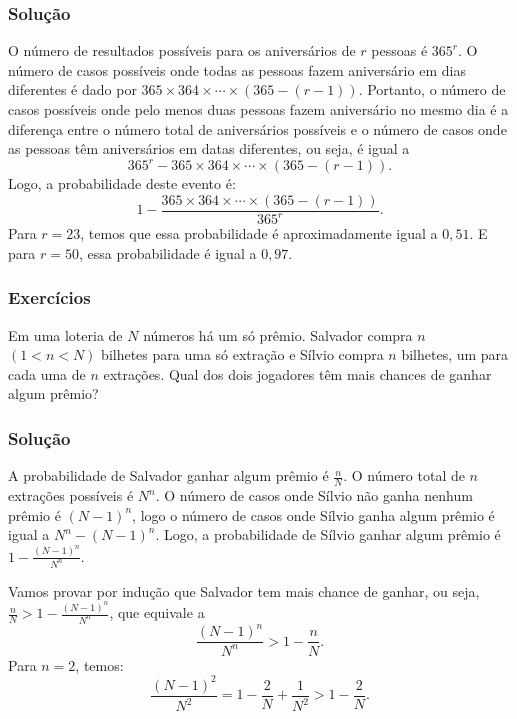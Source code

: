 \begin{frame}
\frametitle{\textbf{Solução}}
\baselineskip=13pt


O número de resultados possíveis para os
aniversários de $r$ pessoas é $365^r$. O número de casos possíveis
onde todas as pessoas fazem aniversário em dias diferentes é dado
por $365\times 364\times \cdots\times(365-(r-1))$. Portanto, o
número de casos possíveis onde pelo menos duas pessoas fazem
aniversário no mesmo dia é a diferença entre o número total de
aniversários possíveis e o número de casos onde as pessoas têm
aniversários em datas diferentes, ou seja, é igual a
$$365^r-365\times 364\times \cdots\times(365-(r-1)).$$
Logo, a probabilidade deste evento é:
$$1-\frac{365\times 364\times \cdots\times(365-(r-1))}{365^r}.$$
Para $r=23$, temos que essa probabilidade é aproximadamente igual a
$0,51$. E para $r=50$, essa probabilidade é igual a $0,97$.

\end{frame}

\begin{frame}
\frametitle{\textbf{Exercícios}}
\baselineskip=13pt


\begin{example}
Em uma loteria de $N$ números há um só prêmio. Salvador compra $n$
$(1<n<N)$ bilhetes para uma só extração e Sílvio compra $n$
bilhetes, um para cada uma de $n$ extrações. Qual dos dois jogadores
têm mais chances de ganhar algum prêmio?
\end{example}
\end{frame}

\begin{frame}
\frametitle{\textbf{Solução}}
\baselineskip=13pt

A probabilidade de Salvador ganhar algum prêmio é
$\frac{n}{N}$. O número total de $n$ extrações possíveis é $N^n$. O
número de casos onde Sílvio não ganha nenhum prêmio é $(N-1)^n$,
logo o número de casos onde Sílvio ganha algum prêmio é igual a
$N^n-(N-1)^n$. Logo, a probabilidade de Sílvio ganhar algum prêmio é
$1-\frac{(N-1)^n}{N^n}$.

Vamos provar por indução que Salvador tem mais chance de ganhar, ou
seja, $\frac{n}{N}>1-\frac{(N-1)^n}{N^n}$, que equivale a
$$\frac{(N-1)^n}{N^n}>1-\frac{n}{N}.$$
Para $n=2$, temos:
$$\frac{(N-1)^2}{N^2}=1-\frac{2}{N}+\frac{1}{N^2}>1-\frac{2}{N}.$$
\end{frame}

